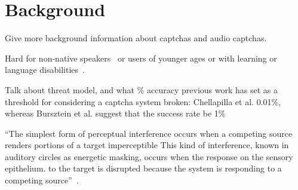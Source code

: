 \section{Background}
\label{sec:background}

Give more background information about captchas and audio captchas.

Hard for non-native speakers~\cite{yan2008usability} or users of 
younger ages or with learning or language disabilities~\cite{schlaikjer2007dual}.

Talk about threat model, and what \% accuracy previous work has
set as a threshold for considering a captcha system broken:
Chellapilla et al. \cite{chellapilla2005designing} 0.01\%,
whereas Bursztein et al. \cite{bursztein2011failure} suggest that
the success rate be 1\%

``The simplest form of perceptual interference occurs when a competing source renders portions of a target imperceptible
This kind of interference, known in auditory circles as energetic masking, occurs when the response on the sensory epithelium.
to the target is disrupted because the system is responding to a competing source''~\cite{shinn2008object}.
